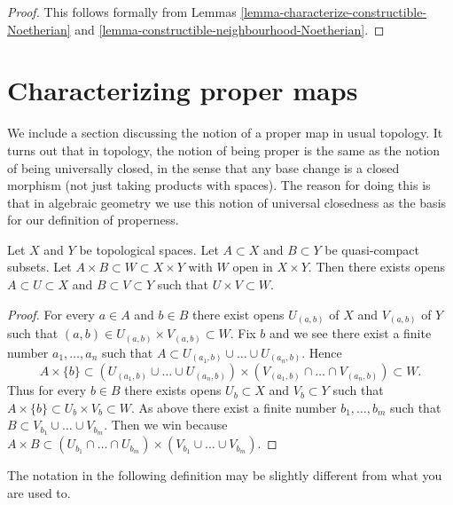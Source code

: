 \begin{proof}
This follows formally from
Lemmas \ref{lemma-characterize-constructible-Noetherian} and
\ref{lemma-constructible-neighbourhood-Noetherian}.
\end{proof}







\section{Characterizing proper maps}
\label{section-proper}

\noindent
We include a section discussing the notion of a proper map in usual
topology. It turns out that in topology, the notion of being proper
is the same as the notion of being universally closed, in the sense
that any base change is a closed morphism (not just taking products
with spaces). The reason for doing this is that in algebraic geometry
we use this notion of universal closedness as the basis for our
definition of properness.

\begin{lemma}
\label{lemma-tube}
Let $X$ and $Y$ be topological spaces.
Let $A \subset X$ and $B \subset Y$ be quasi-compact subsets.
Let $A \times B \subset W \subset X \times Y$ with $W$
open in $X \times Y$. Then there exists opens $A \subset U \subset X$
and $B \subset V \subset Y$ such that $U \times V \subset W$.
\end{lemma}

\begin{proof}
For every $a \in A$ and $b \in B$ there exist opens
$U_{(a, b)}$ of $X$ and $V_{(a, b)}$ of $Y$ such that
$(a, b) \in U_{(a, b)} \times V_{(a, b)} \subset W$.
Fix $b$ and we see there exist a finite number $a_1, \ldots, a_n$
such that $A \subset U_{(a_1, b)} \cup \ldots \cup U_{(a_n, b)}$.
Hence
$$
A \times \{b\} \subset
(U_{(a_1, b)} \cup \ldots \cup U_{(a_n, b)}) \times
(V_{(a_1, b)} \cap \ldots \cap V_{(a_n, b)}) \subset W.
$$
Thus for every $b \in B$ there exists opens $U_b \subset X$ and
$V_b \subset Y$ such that $A \times \{b\} \subset U_b \times V_b \subset W$.
As above there exist a finite number $b_1, \ldots, b_m$ such
that $B \subset V_{b_1} \cup \ldots \cup V_{b_m}$.
Then we win because
$A \times B \subset
(U_{b_1} \cap \ldots \cap U_{b_m}) \times
(V_{b_1} \cup \ldots \cup V_{b_m})$.
\end{proof}

\noindent
The notation in the following definition may be slightly different
from what you are used to.

